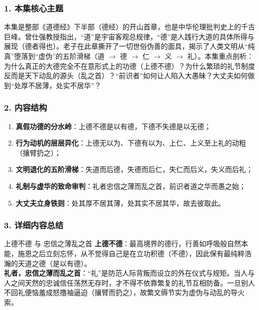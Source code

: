 \subsubsection{1. 本集核心主题}
本集是整部《道德经》下半部（德经）的开山首章，也是中华伦理批判史上的千古巨峰。曾仕强教授指出，“道”是宇宙客观总规律，“德”是人践行大道的具体所得与展现（德者得也）。老子在此章撕开了一切世俗伪善的面具，揭示了人类文明从“纯真”堕落到“虚伪”的五阶滑梯（道 $\rightarrow$ 德 $\rightarrow$ 仁 $\rightarrow$ 义 $\rightarrow$ 礼）。本集重点剖析：为什么真正的大德完全不在意形式上的功德（上德不德）？为什么繁琐的礼节制度反而是天下动乱的源头（乱之首）？“前识者”如何让人陷入大愚昧？大丈夫如何做到“处厚不居薄，处实不居华”？

\subsubsection{2. 内容结构}
\begin{enumerate}
    \item \textbf{真假功德的分水岭}：上德不德是以有德，下德不失德是以无德；
    \item \textbf{行为动机的层层异化}：上德无以为、下德有以为、上仁、上义至上礼的动粗（攘臂扔之）；
    \item \textbf{文明退化的五阶滑梯}：失道而后德，失德而后仁，失仁而后义，失义而后礼；
    \item \textbf{礼制与虚华的致命审判}：礼者忠信之薄而乱之首，前识者道之华而愚之始；
    \item \textbf{大丈夫立身铁则}：处其厚不居其薄，处其实不居其华，故去彼取此。
\end{enumerate}

\subsubsection{3. 详细内容总结}

\begin{ConceptBox}{上德不德 与 忠信之薄乱之首}
\textbf{上德不德}：最高境界的德行，行善如呼吸般自然本能，施恩之后立刻忘怀，从不觉得自己是在立功积德（不德），因此保有最纯粹浩瀚的天道之德（是以有德）。\\
\textbf{礼者，忠信之薄而乱之首}：“礼”是防范人际背叛而设立的外在仪式与规矩。当人与人之间天然的忠诚信任荡然无存时，才不得不依靠繁复的礼节互相防备。一旦别人不回礼便恼羞成怒撸袖逼迫（攘臂而扔之），故繁文缛节实为虚伪与动乱的导火索。
\end{ConceptBox}

